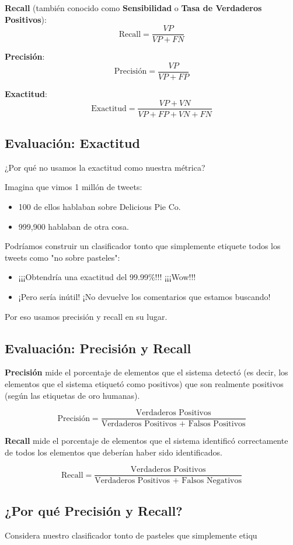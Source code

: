 \textbf{Recall} (también conocido como \textbf{Sensibilidad} o \textbf{Tasa de Verdaderos Positivos}):
\[ \text{Recall} = \frac{VP}{VP + FN} \]

\textbf{Precisión}:
\[ \text{Precisión} = \frac{VP}{VP + FP} \]

\textbf{Exactitud}:
\[ \text{Exactitud} = \frac{VP + VN}{VP + FP + VN + FN} \]


\subsection{Evaluación: Exactitud}
¿Por qué no usamos la exactitud como nuestra métrica?

Imagina que vimos 1 millón de tweets:
\begin{itemize}
\item 100 de ellos hablaban sobre Delicious Pie Co.
\item 999,900 hablaban de otra cosa.
\end{itemize}

Podríamos construir un clasificador tonto que simplemente etiquete todos los tweets como "no sobre pasteles":
\begin{itemize}
\item ¡¡¡Obtendría una exactitud del 99.99\%!!! ¡¡¡Wow!!!
\item ¡Pero sería inútil! ¡No devuelve los comentarios que estamos buscando!
\end{itemize}

Por eso usamos precisión y recall en su lugar.

\subsection{Evaluación: Precisión y Recall}
\textbf{Precisión} mide el porcentaje de elementos que el sistema detectó (es decir, los elementos que el sistema etiquetó como positivos) que son realmente positivos (según las etiquetas de oro humanas).

\[
\text{Precisión} = \frac{\text{Verdaderos Positivos}}{\text{Verdaderos Positivos + Falsos Positivos}}
\]

\textbf{Recall} mide el porcentaje de elementos que el sistema identificó correctamente de todos los elementos que deberían haber sido identificados.

\[
\text{Recall} = \frac{\text{Verdaderos Positivos}}{\text{Verdaderos Positivos + Falsos Negativos}}
\]

\subsection{¿Por qué Precisión y Recall?}
Considera nuestro clasificador tonto de pasteles que simplemente etiqu

